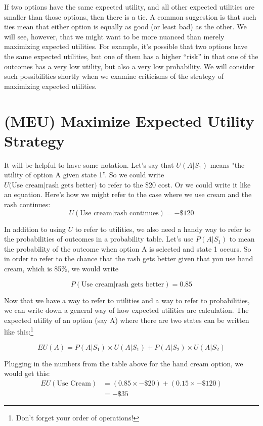 \documentclass[]{tufte-book}
\begin{document}
If two options have the same expected utility, and all other expected utilities are smaller than those options, then there is a tie. A common suggestion is that such ties mean that either option is equally as good (or least bad) as the other. We will see, however, that we might want to be more nuanced than merely maximizing expected utilities. For example, it's possible that two options have the same expected utilities, but one of them has a higher ``risk'' in that one of the outcomes has a very low utility, but also a very low probability. We will consider such possibilities shortly when we examine criticisms of the strategy of maximizing expected utilities.

\hypertarget{meu-maximize-expected-utility-strategy}{%
\section{(MEU) Maximize Expected Utility Strategy}\label{meu-maximize-expected-utility-strategy}}

It will be helpful to have some notation. Let's say that \(U(A|S_1)\) means "the utility of option A given state 1''. So we could write \(U\text{(Use cream}|\text{rash gets better})\) to refer to the \$20 cost. Or we could write it like an equation. Here's how we might refer to the case where we use cream and the rash continues:
\[
U(\text{Use cream} | \text{rash continues}) = -\$120
\]

In addition to using \(U\) to refer to utilities, we also need a handy way to refer to the probabilities of outcomes in a probability table.
Let's use \(P(A|S_1)\) to mean the probability of the outcome when option A is selected and state 1 occurs. So in order to refer to the chance that the rash gets better given that you use hand cream, which is 85\%, we would write

\[
P(\text{Use cream} | \text{rash gets better}) = 0.85
\]

Now that we have a way to refer to utilities and a way to refer to probabilities, we can write down a general way of how expected utilities are calculation. The expected utility of an option (say A) where there are two states can be written like this:\footnote{Don't forget your order of operations!}

\[
EU(A) = P(A|S_1)\times U(A|S_1) +  P(A|S_2)\times U(A|S_2)
\]

Plugging in the numbers from the table above for the hand cream option, we would get this:
\[
  \begin{aligned}
  EU(\text{Use Cream}) &= (0.85\times -\$20) + (0.15\times -\$120)\\
      &= -\$35
  \end{aligned}
\]
\end{document}
